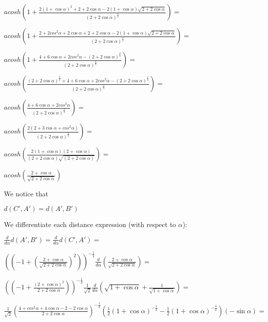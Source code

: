 \documentclass[a4paper,10pt]{article}
\begin{document}
$acosh\left(1 + \frac{2\left(1 + \cos{\alpha}\right)^{2} + 2 + 2 \cos{\alpha} - 2\left(1 + \cos{\alpha}\right)\sqrt{2 + 2 \cos{\alpha}}}{\left(2 + 2 \cos{\alpha}\right)^{\frac{3}{2}}}\right) =$

$acosh\left(1 + \frac{2 + 2cos^{2}{\alpha} + 2\cos{\alpha} + 2 + 2 \cos{\alpha} - 2\left(1 + \cos{\alpha}\right)\sqrt{2 + 2 \cos{\alpha}}}{\left(2 + 2 \cos{\alpha}\right)^{\frac{3}{2}}}\right) =$

$acosh\left(1 + \frac{4 + 6 \cos{\alpha} + 2 cos^{2}{\alpha} - \left(2 + 2 \cos{\alpha}\right)^{\frac{3}{2}}}{\left(2 + 2 \cos{\alpha}\right)^{\frac{3}{2}}}\right) =$

$acosh\left(\frac{\left(2 + 2 \cos{\alpha}\right)^{\frac{3}{2}} + 4 + 6 \cos{\alpha} + 2 cos^{2}{\alpha} - \left(2 + 2 \cos{\alpha}\right)^{\frac{3}{2}}}{\left(2 + 2 \cos{\alpha}\right)^{\frac{3}{2}}}\right) =$

$acosh\left(\frac{4 + 6 \cos{\alpha} + 2 cos^{2}{\alpha}}{\left(2 + 2 \cos{\alpha}\right)^{\frac{3}{2}}}\right) =$

$acosh\left(\frac{2 \left(2 + 3 \cos{\alpha} + cos^{2}{\alpha}\right)}{\left(2 + 2\cos{\alpha}\right)^{\frac{3}{2}}}\right) =$

$acosh\left(\frac{2 \left(1 + \cos{\alpha}\right)\left(2 + \cos{\alpha}\right)}{\left(2 + 2\cos{\alpha}\right) \sqrt{\left(2 + 2\cos{\alpha}\right) } } \right) =$

$acosh\left(\frac{2 + \cos{\alpha}}{\sqrt{2 + 2 \cos{\alpha}}}\right)$

\noindent
We notice that
\begin {center}
$ d\left(C', A'\right)=d\left(A', B'\right) $
\end {center}

\noindent
We differentiate each distance expression (with respect to $\alpha$):

\noindent$\frac{d}{d\alpha}d\left(A', B'\right)=\frac{d}{d\alpha}d\left(C', A'\right)=$

$ \left(\left(-1 + \left( \frac{2 + \cos{\alpha}}
                        {\sqrt{2 + 2 \cos{\alpha}}}\right ) ^{2}\right)\right)^{-\frac{1}{2}}    \frac{d}{d\alpha}\left (\frac{2 + \cos{\alpha}}{\sqrt{2 + 2 \cos{\alpha}}}\right) =$

$ \left(\left(-1 + \frac{\left(2 + \cos{\alpha}\right)^{2}}{2 + 2 \cos{\alpha}}\right)\right)^{-\frac{1}{2}}  \frac{1}{\sqrt{2}}\frac{d}{d\alpha}\left (\sqrt{1 + \cos{\alpha}} + \frac{1}{\sqrt{1 + \cos{\alpha}}}\right) =$

$ \frac{1}{\sqrt{2}} \left(\frac{4 + cos^{2}{\alpha} + 4\cos{\alpha} - 2 - 2\cos{\alpha}}{2 + 2\cos{\alpha}}\right)^{-\frac{1}{2}}
  \left(\frac{1}{2}\left(1 + \cos{\alpha}\right)^{-\frac{1}{2}} -\frac{1}{2}\left(1 + \cos{\alpha}\right)^{-\frac{3}{2}}\right)\left(-\sin{\alpha}\right) =$
\end{document}
